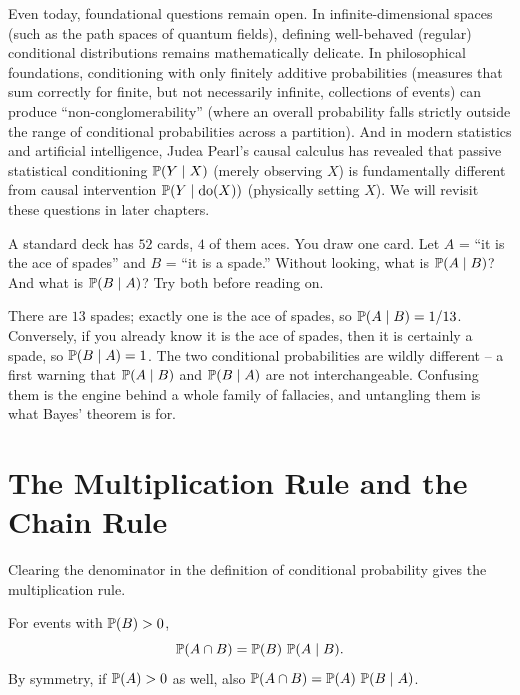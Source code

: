 \begin{historybox}
Even today, foundational questions remain open. In infinite-dimensional spaces (such as the path spaces of quantum fields), defining well-behaved (regular) conditional distributions remains mathematically delicate. In philosophical foundations, conditioning with only finitely additive probabilities (measures that sum correctly for finite, but not necessarily infinite, collections of events) can produce ``non-conglomerability'' (where an overall probability falls strictly outside the range of conditional probabilities across a partition). And in modern statistics and artificial intelligence, Judea Pearl's causal calculus has revealed that passive statistical conditioning $\P(Y \given X)$ (merely observing $X$) is fundamentally different from causal intervention $\P(Y \given \operatorname{do}(X))$ (physically setting $X$). We will revisit these questions in later chapters.
\end{historybox}

\begin{walkbox}
A standard deck has $52$ cards, $4$ of them aces. You draw one card. Let $A$ = ``it is the ace of spades'' and $B$ = ``it is a spade.'' Without looking, what is $\P(A \given B)$? And what is $\P(B \given A)$? Try both before reading on.

There are $13$ spades; exactly one is the ace of spades, so $\P(A\given B) = 1/13$. Conversely, if you already know it is the ace of spades, then it is certainly a spade, so $\P(B\given A) = 1$. The two conditional probabilities are wildly different -- a first warning that $\P(A\given B)$ and $\P(B\given A)$ are not interchangeable. Confusing them is the engine behind a whole family of fallacies, and untangling them is what Bayes' theorem is for.
\end{walkbox}

\section{The Multiplication Rule and the Chain Rule}
\label{ch04:multiplication}

Clearing the denominator in the definition of conditional probability gives the multiplication rule.

\begin{proposition}
\label{ch04:mult-rule}
For events with $\P(B) > 0$,
\[
\P(A \cap B) = \P(B)\,\P(A \given B).
\]
By symmetry, if $\P(A) > 0$ as well, also $\P(A\cap B) = \P(A)\,\P(B \given A)$.
\end{proposition}

